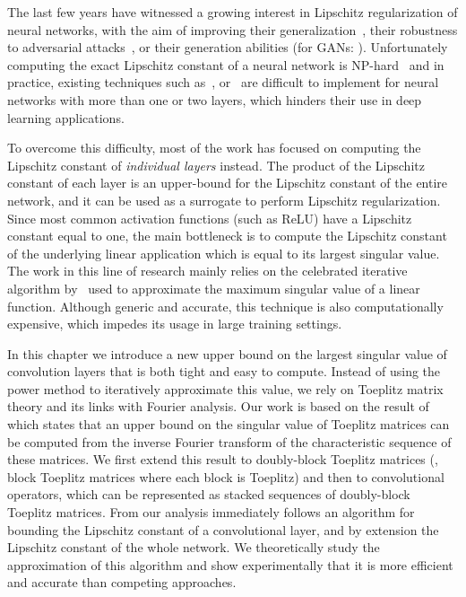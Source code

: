 {%

The last few years have witnessed a growing interest in Lipschitz regularization of neural networks, with the aim of improving their generalization~\cite{bartlett2017spectrally}, their robustness to adversarial attacks~\cite{tsuzuku2018lipschitz, farnia2018generalizable}, or their generation abilities (\eg for GANs: \citet{miyato2018spectral,arjovsky2017wasserstein}).
Unfortunately computing  the exact Lipschitz constant of a neural network is NP-hard~\cite{scaman2018lipschitz} and in practice, existing techniques such as~\citet{scaman2018lipschitz}, \citet{fazlyab2019efficient} or~\citet{latorre2020lipschitz} are difficult to implement for neural networks with more than one or two layers, which hinders their use in deep learning applications.

To overcome this difficulty, most of the work has focused on computing the Lipschitz constant of \emph{individual layers} instead.
The product of the Lipschitz constant of each layer is an upper-bound for the Lipschitz constant of the entire network, and it can be used as a surrogate to perform Lipschitz regularization.
Since most common activation functions (such as ReLU) have a Lipschitz constant equal to one, the main bottleneck is to compute the Lipschitz constant of the underlying linear application which is equal to its largest singular value.
The work in this line of research mainly relies on the celebrated iterative algorithm by~\citet{golub2000eigenvalue} used to approximate the maximum singular value of a linear function.
Although generic and accurate, this technique is also computationally expensive, which impedes its usage in large training settings.

In this chapter we introduce a new upper bound on the largest singular value of convolution layers that is both tight and easy to compute.
Instead of using the power method to iteratively approximate this value, we rely on Toeplitz matrix theory and its links with Fourier analysis.
Our work is based on the result of~\citet{gray2006toeplitz} which states that an upper bound on the singular value of Toeplitz matrices can be computed from the inverse Fourier transform of the characteristic sequence of these matrices.
We first extend this result to doubly-block Toeplitz matrices (\ie, block Toeplitz matrices where each block is Toeplitz) and then to convolutional operators, which can be represented as stacked sequences of doubly-block Toeplitz matrices.
From our analysis immediately follows an algorithm for bounding the Lipschitz constant of a convolutional layer, and by extension the Lipschitz constant of the whole network.
We theoretically study the approximation of this algorithm and show experimentally that it is more efficient and accurate than competing approaches.

}
